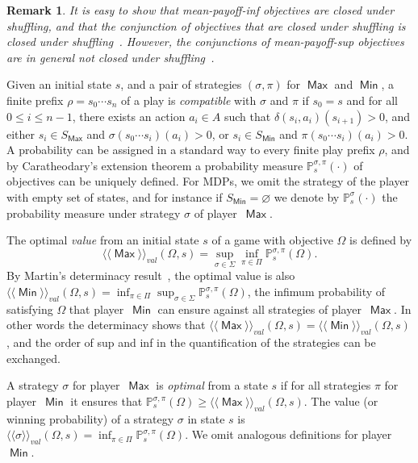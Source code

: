 \documentclass{article}
\newtheorem{remark}{Remark}
\let\emptyset\varnothing
\newcommand{\PP}{\delta}
\newcommand{\winval}[1]{\langle \! \langle #1 \rangle\! \rangle_{\mathit{val}} }
\newcommand{\va}{\winval{\ma}}
\newcommand{\vb}{\winval{\mi}}
\newcommand{\straava}{\winval{\straa}}
\newcommand{\straa}{\sigma}
\newcommand{\Straa}{\Sigma}
\newcommand{\strab}{\pi}
\newcommand{\Strab}{\Pi}
\DeclareMathOperator{\ma}{\mathsf{Max}}
\DeclareMathOperator{\mi}{\mathsf{Min}}
\newcommand{\prob}[1]{\mathbb{P}_{#1}}
\begin{document}
\begin{remark}\label{rmk:mean-payoff-inf-not-closed-under-shuffling}
It is easy to show that mean-payoff-inf objectives are closed under shuffling,
and that the conjunction of objectives that are closed under shuffling
is closed under shuffling~\cite{Kop06}. However, the conjunctions of mean-payoff-sup
objectives are in general not closed under shuffling~\cite[Example~1]{VCDHRR15}.
\end{remark}


\smallskip{}
Given an initial state $s$, and a pair of strategies $(\straa,\strab)$ for $\ma$ and $\mi$,
a finite prefix $\rho = s_0  \cdots s_n$ of a play is \emph{compatible}
with $\straa$ and $\strab$ if $s_0 = s$ and for all $0 \leq i \leq n-1$, there exists an action
$a_i \in A$ such that $\PP(s_{i}, a_i)(s_{i+1}) > 0$, 
and either $s_i \in S_{\ma}$ and $\straa(s_0 \cdots s_{i})(a_i) > 0$,
or $s_i \in S_{\mi}$ and $\strab(s_0 \cdots s_{i})(a_i) > 0$.
A probability can be assigned in a standard way to every finite play prefix $\rho$, 
and by Caratheodary's extension theorem a probability measure $\prob{s}^{\straa,\strab}(\cdot)$ 
of objectives can be uniquely defined.  
For MDPs, we omit the strategy of the player with empty set of states, and 
for instance if $S_{\mi} = \emptyset$ we denote by $\prob{s}^{\straa}(\cdot)$ 
the probability measure under strategy $\straa$ of player~$\ma$.


\smallskip{}
The optimal \emph{value} from an initial state $s$ of a game with objective $\Omega$ is defined by
$$\va(\Omega,s) = \sup_{\straa \in \Straa} \inf_{\strab \in \Strab} \prob{s}^{\straa,\strab}(\Omega).$$
By Martin's determinacy result~\cite{Mar98}, the optimal value is also 
$\vb(\Omega,s) = \inf_{\strab \in \Strab} \sup_{\straa \in \Straa} \prob{s}^{\straa,\strab}(\Omega)$,
the infimum probability of satisfying $\Omega$ that player~$\mi$ can ensure
against all strategies of player~$\ma$.
In other words the determinacy shows that $\va(\Omega,s) = \vb(\Omega,s)$, and the order
of sup and inf in the quantification of the strategies can be exchanged.

A strategy $\straa$ for player~$\ma$ is \emph{optimal} from a state $s$
if for all strategies $\strab$ for player~$\mi$ it ensures that 
$\prob{s}^{\straa,\strab}(\Omega) \geq \va(\Omega,s)$. The value (or winning probability) of
a strategy $\straa$ in state $s$ is $\straava(\Omega,s) = \inf_{\strab \in \Strab} \prob{s}^{\straa,\strab}(\Omega)$. 
We omit analogous definitions for player~$\mi$.
\end{document}
